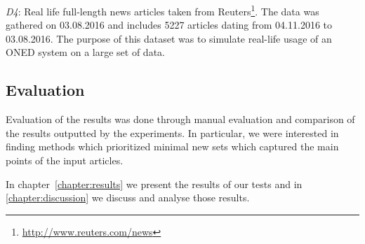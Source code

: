 \emph{D4}: Real life full-length news articles taken from Reuters\footnote{\url{http://www.reuters.com/news}}. The data was gathered on 03.08.2016 and includes 5227 articles dating from 04.11.2016 to 03.08.2016. The purpose of this dataset was to simulate real-life usage of an ONED system on a large set of data.

\subsection{Evaluation}
Evaluation of the results was done through manual evaluation and comparison of the results outputted by the experiments. In particular, we were interested in finding methods which prioritized minimal new sets which captured the main points of the input articles. 


In chapter~\ref{chapter:results} we present the results of our tests and in \cref{chapter:discussion} we discuss and analyse those results.
